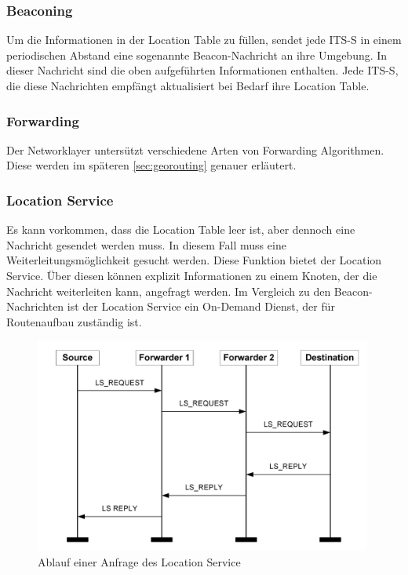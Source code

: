 \subsubsection{Beaconing}
Um die Informationen in der Location Table zu füllen, sendet jede \ac{ITS-S} in einem periodischen Abstand eine sogenannte Beacon-Nachricht an ihre Umgebung. In dieser Nachricht sind die oben aufgeführten Informationen enthalten. Jede \ac{ITS-S}, die diese Nachrichten empfängt aktualisiert bei Bedarf ihre Location Table.

\subsubsection{Forwarding}
Der Networklayer untersützt verschiedene Arten von Forwarding Algorithmen. Diese werden im späteren \autoref{sec:georouting} genauer erläutert.

\subsubsection{Location Service}
Es kann vorkommen, dass die Location Table leer ist, aber dennoch  eine Nachricht gesendet werden muss. In diesem Fall muss eine Weiterleitungsmöglichkeit gesucht werden. Diese Funktion bietet der Location Service. 
Über diesen können explizit Informationen zu einem Knoten, der die Nachricht weiterleiten kann, angefragt werden. Im Vergleich zu den Beacon-Nachrichten ist der Location Service ein On-Demand Dienst, der für Routenaufbau zuständig ist.

\begin{figure}
	\includegraphics[width=0.99\textwidth]{content/images/03_networklayer/location-service-diagramm.jpg}
	\caption{Ablauf einer Anfrage des Location Service}
	\label{fig:locser}
\end{figure}

